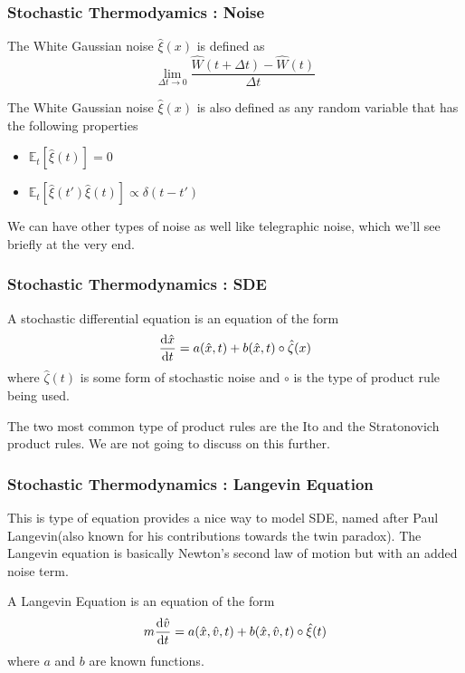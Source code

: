 \documentclass{beamer}
\begin{document}
\begin{frame}
  \frametitle{Stochastic Thermodyamics : Noise}
  \begin{definition}
    The White Gaussian noise $\hat{\xi}(x)$ is defined as 
    \begin{displaymath}
      \lim_{\Delta t \rightarrow 0} \frac{\hat{W}(t+\Delta t)-\hat{W}(t)}{\Delta t}
    \end{displaymath}
  \end{definition}
  \begin{definition}
    The White Gaussian noise $\hat{\xi}(x)$ is also defined as any random variable that has the 
    following properties
      \begin{itemize}
        \item $\mathbb{E}_{t}[\hat{\xi}(t)] = 0$
        \item $\mathbb{E}_{t}[\hat{\xi}(t')\hat{\xi}(t)] \propto \delta (t-t')$
    \end{itemize}
  \end{definition}
  We can have other types of noise as well like telegraphic noise, which we'll see briefly at the 
  very end.
\end{frame}
\begin{frame}
  \frametitle{Stochastic Thermodynamics : SDE}
  \begin{definition}
    A stochastic differential equation is an equation of the form 
    \begin{displaymath}
      \dv{\hat{x}}{t} = a(\hat{x},t) + b(\hat{x},t)\circ\hat{\zeta}(x)
    \end{displaymath}
    where $\hat{\zeta}(t)$ is some form of stochastic noise and $\circ$ is the type of product rule 
    being used.

  \end{definition}
  The two most common type of product rules are the Ito and the Stratonovich product rules. We 
  are not going to discuss on this further.
\end{frame}
\begin{frame}
  \frametitle{Stochastic Thermodynamics : Langevin Equation}
  This is type of equation provides a nice way to model SDE, named after Paul Langevin(also known 
  for his contributions towards the twin paradox). The Langevin equation is basically Newton's second law of
  motion but with an added noise term.
  \begin{definition}
    A Langevin Equation is an equation of the form
    \begin{displaymath}
      m\dv{\hat{v}}{t} = a(\hat{x},\hat{v},t) + b(\hat{x},\hat{v},t) \circ \hat{\xi}(t)
    \end{displaymath}
    where $a$ and $b$ are known functions.
  \end{definition}
  
\end{frame}
\end{document}
